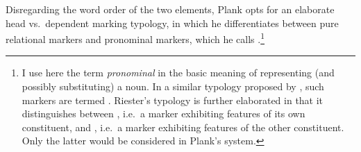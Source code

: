 Disregarding the word order of the two elements, Plank opts for an elaborate head vs.\ dependent marking typology, in which he differentiates between pure relational markers and pronominal markers, which he calls .\footnote{I use here the term \emph{pronominal} in the basic meaning of representing (and possibly substituting) a noun.
In a similar typology proposed by \citet[ch.\ 2]{Riester}, such markers are termed . Riester's  typology is further elaborated in that it distinguishes between , i.e.\ a marker exhibiting features of its own constituent, and , i.e.\ a marker exhibiting features of the other constituent. Only the latter would be considered  in Plank's system.} 

